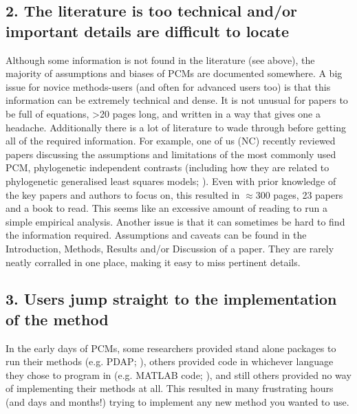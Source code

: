 \documentclass[a4paper,12pt]{article}
\begin{document}
  \subsection{2. The literature is too technical and/or important details are difficult to locate}
    Although some information is not found in the literature (see above), the majority of assumptions and biases of PCMs are documented somewhere. 
    A big issue for novice methods-users (and often for advanced users too) is that this information can be extremely technical and dense.
    It is not unusual for papers to be full of equations, \textgreater 20 pages long, and written in a way that gives one a headache. 
    Additionally there is a lot of literature to wade through before getting all of the required information. 
    For example, one of us (NC) recently reviewed papers discussing the assumptions and limitations of the most commonly used PCM, phylogenetic independent contrasts \citep{felsenstein1985phylogenies} (including how they are related to phylogenetic generalised least squares models; \citealp{blomberg2012independent,rohle2006comment}). 
    Even with prior knowledge of the key papers and authors to focus on, this resulted in $\approx 300$ pages, 23 papers and a book to read.
    This seems like an excessive amount of reading to run a simple empirical analysis.
    Another issue is that it can sometimes be hard to find the information required. 
    Assumptions and caveats can be found in the Introduction, Methods, Results and/or Discussion of a paper. 
    They are rarely neatly corralled in one place, making it easy to miss pertinent details. 

  \subsection{3. Users jump straight to the implementation of the method}
    In the early days of PCMs, some researchers provided stand alone packages to run their methods (e.g. PDAP; \citealp{diaz1996testing}), others provided code in whichever language they chose to program in (e.g. MATLAB code; \citealp{rohlf2001comparative}), and still others provided no way of implementing their methods at all. 
    This resulted in many frustrating hours (and days and months!) trying to implement any new method you wanted to use.\\
\end{document}
